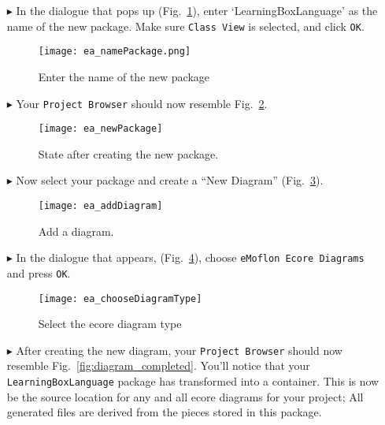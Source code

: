 \begin{itemize}
\vspace{1.0cm}

\item[$\blacktriangleright$] In the dialogue that pops up (Fig.~\ref{fig:new_package_name}), enter `Learning\-Box\-Language' as the name of the new package.
Make sure \texttt{Class View} is selected, and click \texttt{OK}.

\begin{figure}[htbp]
	\centering
    \texttt{[image: ea\_namePackage.png]}
	\caption{Enter the name of the new package}
	\label{fig:new_package_name}
\end{figure}
\FloatBarrier

\vspace{1.0cm}

\item[$\blacktriangleright$] Your \texttt{Project Browser} should now resemble Fig.~\ref{fig:new_package_completed}.

\begin{figure}[htbp]
	\centering
  \texttt{[image: ea\_newPackage]}
	\caption{State after creating the new package.}
	\label{fig:new_package_completed}
\end{figure}
\FloatBarrier

\clearpage
\item[$\blacktriangleright$] Now select your package and create a ``New Diagram'' (Fig.~\ref{fig:diagram}).

\begin{figure}[htbp]
	\centering
  \texttt{[image: ea\_addDiagram]}
	\caption{Add a diagram.}
	\label{fig:diagram}
\end{figure}
\FloatBarrier

\item[$\blacktriangleright$] In the dialogue that appears, (Fig.~\ref{fig:diagram_type}), choose \texttt{eMoflon Ecore Diagrams} and press \texttt{OK}. 

\begin{figure}[htbp]
	\centering
  \texttt{[image: ea\_chooseDiagramType]}
	\caption{Select the ecore diagram type}
	\label{fig:diagram_type}
\end{figure}
\FloatBarrier

 
\item[$\blacktriangleright$] After creating the new diagram, your  \texttt{Project Browser} should now resemble Fig.~\ref{fig:diagram_completed}. You'll notice
that your \texttt{LearningBoxLanguage} package has transformed into a container. This is now be the source location for any and all ecore diagrams for your
project; All generated files are derived from the pieces stored in this package.


\end{itemize}
